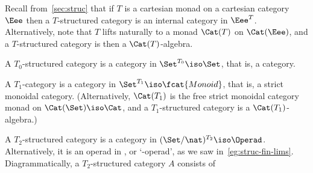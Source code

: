Recall from~\ref{sec:struc} that if $T$ is a cartesian monad on a cartesian
category $\Eee$ then a $T$-structured category is an internal category in
$\Eee^T$.  Alternatively, note that $T$ lifts naturally to a monad
$\Cat(T)$ on $\Cat(\Eee)$, and a $T$-structured category is then a
$\Cat(T)$-algebra.

A $T_0$-structured category is a category in $\Set^{T_0} \iso \Set$, that
is, a category.  

A $T_1$-category is a category in $\Set^{T_1} \iso \fcat{Monoid}$, that is,
a strict monoidal category.  (Alternatively, $\Cat(T_1)$ is the free strict
monoidal category monad on $\Cat(\Set) \iso \Cat$, and a $T_1$-structured
category is a $\Cat(T_1)$-algebra.)

A $T_2$-structured category is a category in $(\Set/\nat)^{T_2} \iso
\Operad$.  Alternatively, it is an operad in \Cat, or `\Cat-operad',%
%
%
as we
saw in~\ref{eg:struc-fin-lims}.  Diagrammatically, a $T_2$-structured
category $A$ consists of
%

